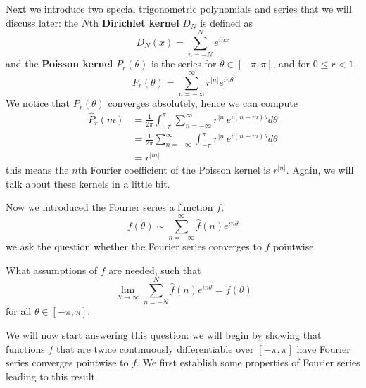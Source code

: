 Next we introduce two special trigonometric polynomials and series that we will discuss later: the $N$th \textbf{ Dirichlet kernel} $D_N$ is defined as
\begin{equation*}
    D_N(x)=\sum_{n=-N}^Ne^{inx}
\end{equation*} 
and the \textbf{Poisson kernel} $P_r(\theta)$ is the series for $\theta\in [-\pi,\pi]$, and for $0\leq r<1$, 
\begin{equation*}
    P_r(\theta)=\sum_{n=-\infty}^\infty r^{|n|}e^{in\theta}
\end{equation*}
We notice that $P_r(\theta)$ converges absolutely, hence we can compute 
\begin{align*}
    \hat{P}_r(m)&=\frac{1}{2\pi}\int_{-\pi}^{\pi}\sum_{n=-\infty}^\infty r^{|n|}e^{i(n-m)\theta}d\theta\\
    &=\frac{1}{2\pi}\sum_{n=-\infty}^\infty\int_{-\pi}^\pi r^{|n|}e^{i(n-m)\theta}d\theta\\
    &=r^{|m|}
\end{align*}
this means the $n$th Fourier coefficient of the Poisson kernel is $r^{|n|}$. Again, we will talk about these kernels in a little bit.

Now we introduced the Fourier series a function $f$, 
\begin{equation*}
    f(\theta)\sim \sum_{n=-\infty}^\infty \hat{f}(n)e^{in\theta}
\end{equation*}
we ask the question whether the Fourier series converges to $f$ pointwise. 
\begin{prob}\label{2.1}
    What assumptions of $f$ are needed, such that 
    \begin{equation}
        \lim_{N\to\infty}\sum_{n=-N}^N\hat{f}(n)e^{in\theta}=f(\theta)
    \end{equation}
    for all $\theta\in [-\pi,\pi]$.
\end{prob}
We will now start answering this question: we will begin by showing that functions $f$ that are twice continuously differentiable over $[-\pi,\pi]$ have Fourier series converges pointwise to $f$. We first establish some properties of Fourier series leading to this result.

